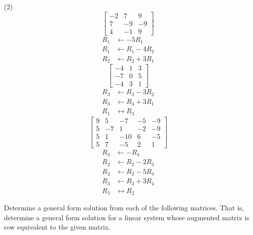 \begin{tasks}[resume, style=enumerate](2)
\task
  \begin{displaymath}
    \begin{bmatrix}
      -2 & 7 & 9 \\
      7 & -9 & -9 \\
      4 & -1 & 9
    \end{bmatrix}
  \end{displaymath}
  \begin{align*}
    R_{1} &\gets -5R_{1} \\
    R_{1} &\gets R_{1} - 4R_{2} \\
    R_{2} &\gets R_{2} + 3R_{1}
  \end{align*}
\task
  \begin{displaymath}
    \begin{bmatrix}
      -4 & 1 & 3 \\
      -7 & 0 & 5 \\
      -4 & 3 & 1
    \end{bmatrix}
  \end{displaymath}
  \begin{align*}
    R_{3} &\gets R_{3} - 3R_{2} \\
    R_{3} &\gets R_{3} + 3R_{1} \\
    R_{1} &\leftrightarrow R_{3}
  \end{align*}
\task
  \begin{displaymath}
    \begin{bmatrix}
      9 & 5 & -7 & -5 & -9 \\
      5 & -7 & 1 & -2 & -9 \\
      5 & 1 & -10 & 6 & -5 \\
      5 & 7 & -5 & 2 & 1
    \end{bmatrix}
  \end{displaymath}
  \begin{align*}
    R_{4} &\gets -R_{4} \\
    R_{2} &\gets R_{2} - 2R_{3} \\
    R_{2} &\gets R_{2} - 5R_{4} \\
    R_{3} &\gets R_{3} + 3R_{4} \\
    R_{3} &\leftrightarrow R_{2}
  \end{align*}
\end{tasks}
Determine a general form solution from each of the following
matrices. That is, determine a general form solution for a linear
system whose augmented matrix is row equivalent to the given matrix.
